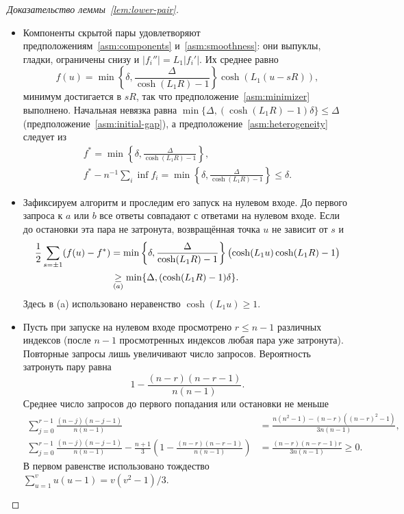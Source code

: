 \begin{proof}[Доказательство леммы~\ref{lem:lower-pair}]
\leavevmode
\begin{itemize}
\item Компоненты скрытой пары удовлетворяют
предположениям~\ref{asm:components} и~\ref{asm:smoothness}: они выпуклы,
гладки, ограничены снизу и $|f_i''|=L_1|f_i'|$. Их среднее равно
\[
 f(u)=\min\left\{\delta,\frac\Delta{\cosh(L_1R)-1}\right\}\cosh(L_1(u-sR)),
\]
минимум достигается в $sR$, так что предположение~\ref{asm:minimizer} выполнено.
Начальная невязка равна $\min\{\Delta,(\cosh(L_1R)-1)\delta\}\le\Delta$
(предположение~\ref{asm:initial-gap}), а предположение~\ref{asm:heterogeneity}
следует из
\[
 \begin{gathered}
 f^\ast=\min\left\{\delta,\frac\Delta{\cosh(L_1R)-1}\right\},\\
 f^\ast-n^{-1}\sum_i\inf f_i=\min\left\{\delta,\frac\Delta{\cosh(L_1R)-1}\right\}\le\delta.
 \end{gathered}
\]

\item Зафиксируем алгоритм и проследим его запуск на нулевом входе.
До первого запроса к $a$ или $b$ все ответы совпадают с ответами на нулевом входе.
Если до остановки эта пара не затронута, возвращённая точка $u$ не зависит от $s$ и
\begin{align*}
 \frac12\sum_{s=\pm1}(f(u)-f^\ast)&=\min\left\{\delta,\frac\Delta{\cosh(L_1R)-1}\right\}\bigl(\cosh(L_1u)\cosh(L_1R)-1\bigr)
 \\&\mathrel{\underset{(a)}{\ge}}\min\{\Delta,(\cosh(L_1R)-1)\delta\}.
\end{align*}
Здесь в (a) использовано неравенство $\cosh(L_1u)\ge1$.

\item Пусть при запуске на нулевом входе просмотрено $r\le n-1$ различных
индексов (после $n-1$ просмотренных индексов любая пара уже затронута).
Повторные запросы лишь увеличивают число запросов.
Вероятность затронуть пару равна
\[
 1-\frac{(n-r)(n-r-1)}{n(n-1)}.
\]
Среднее число запросов до первого попадания или остановки не меньше
\begin{align*}
 \sum_{j=0}^{r-1}\frac{(n-j)(n-j-1)}{n(n-1)}
 &=\frac{n(n^2-1)-(n-r)((n-r)^2-1)}{3n(n-1)},\\
 \sum_{j=0}^{r-1}\frac{(n-j)(n-j-1)}{n(n-1)}
 -\frac{n+1}{3}\left(1-\frac{(n-r)(n-r-1)}{n(n-1)}\right)
 &=\frac{(n-r)(n-r-1)r}{3n(n-1)}\ge0.
\end{align*}
В первом равенстве использовано тождество
$\sum_{u=1}^v u(u-1)=v(v^2-1)/3$.


\end{itemize}
\end{proof}
